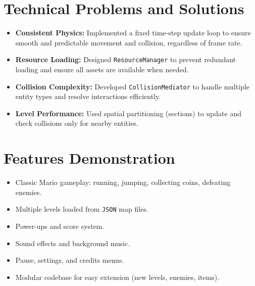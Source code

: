 \begin{flushleft}
\begin{flushleft}
\section{Technical Problems and Solutions}
\begin{itemize}
    \item \textbf{Consistent Physics:} Implemented a fixed time-step update loop to ensure smooth and predictable movement and collision, regardless of frame rate.
    \item \textbf{Resource Loading:} Designed \textcolor{red!70!black}{\texttt{ResourceManager}} to prevent redundant loading and ensure all assets are available when needed.
    \item \textbf{Collision Complexity:} Developed \textcolor{green!60!black}{\texttt{CollisionMediator}} to handle multiple entity types and resolve interactions efficiently.
    \item \textbf{Level Performance:} Used spatial partitioning (sections) to update and check collisions only for nearby entities.
\end{itemize}

\section{Features Demonstration}
\begin{itemize}
    \item Classic Mario gameplay: running, jumping, collecting coins, defeating enemies.
    \item Multiple levels loaded from \textcolor{orange!80!black}{\texttt{JSON}} map files.
    \item Power-ups and score system.
    \item Sound effects and background music.
    \item Pause, settings, and credits menus.
    \item Modular codebase for easy extension (new levels, enemies, items).
\end{itemize}
\end{flushleft}
\end{flushleft}